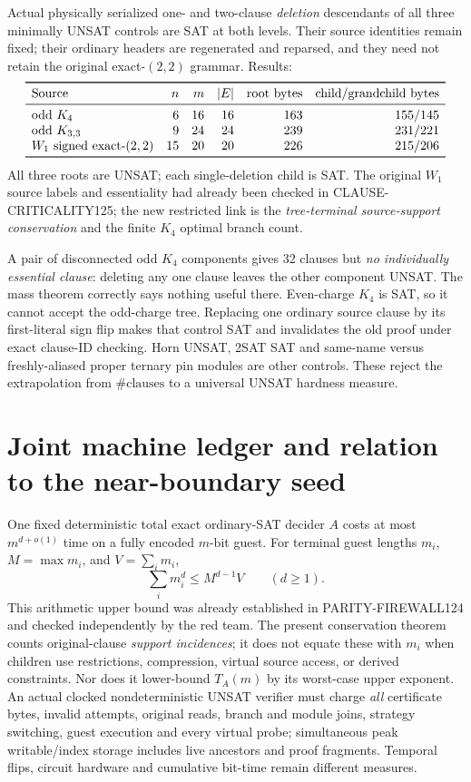 \documentclass[11pt]{article}
\begin{document}
Actual physically serialized one- and two-clause \emph{deletion} descendants of all three minimally UNSAT controls are SAT at both levels. Their source identities remain fixed; their ordinary headers are regenerated and reparsed, and they need not retain the original exact-$(2,2)$ grammar. Results:
\[
\begin{array}{lrrrrr}\toprule
\text{Source}&n&m&|E|&\text{root bytes}&\text{child/grandchild bytes}\\\midrule
\text{odd }K_4&6&16&16&163&155/145\\
\text{odd }K_{3,3}&9&24&24&239&231/221\\
W_1\text{ signed exact-}(2,2)&15&20&20&226&215/206\\\bottomrule
\end{array}
\]
All three roots are UNSAT; each single-deletion child is SAT. The original $W_1$ source labels and essentiality had already been checked in CLAUSE-CRITICALITY125; the new restricted link is the \emph{tree-terminal source-support conservation} and the finite $K_4$ optimal branch count.

A pair of disconnected odd $K_4$ components gives 32 clauses but \emph{no individually essential clause}: deleting any one clause leaves the other component UNSAT. The mass theorem correctly says nothing useful there. Even-charge $K_4$ is SAT, so it cannot accept the odd-charge tree. Replacing one ordinary source clause by its first-literal sign flip makes that control SAT and invalidates the old proof under exact clause-ID checking. Horn UNSAT, 2SAT SAT and same-name versus freshly-aliased proper ternary pin modules are other controls. These reject the extrapolation from $\#\text{clauses}$ to a universal UNSAT hardness measure.

\section{Joint machine ledger and relation to the near-boundary seed}
One fixed deterministic total exact ordinary-SAT decider $A$ costs at most $m^{d+o(1)}$ time on a fully encoded $m$-bit guest. For terminal guest lengths $m_i$, $M=\max m_i$, and $V=\sum_i m_i$,
\[
\sum_i m_i^d\le M^{d-1}V\qquad(d\ge1).
\]
This arithmetic upper bound was already established in PARITY-FIREWALL124 and checked independently by the red team. The present conservation theorem counts original-clause \emph{support incidences}; it does not equate these with $m_i$ when children use restrictions, compression, virtual source access, or derived constraints. Nor does it lower-bound $T_A(m)$ by its worst-case upper exponent. An actual clocked nondeterministic UNSAT verifier must charge \emph{all} certificate bytes, invalid attempts, original reads, branch and module joins, strategy switching, guest execution and every virtual probe; simultaneous peak writable/index storage includes live ancestors and proof fragments. Temporal flips, circuit hardware and cumulative bit-time remain different measures.
\end{document}
